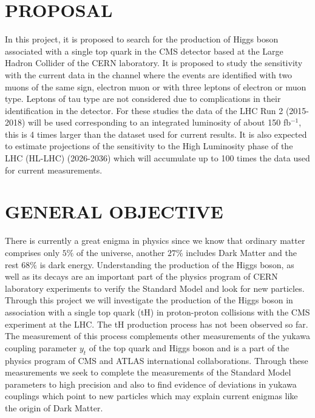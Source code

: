 \documentclass[final,3p]{CSP}
\begin{document}
\newpage
\section{PROPOSAL}

\onehalfspacing In this project, it is proposed to search for the production of Higgs boson associated with a single top quark in the CMS detector based at the Large Hadron Collider of the CERN laboratory.
It is proposed to study the sensitivity with the current data in the channel where the events are identified with two muons of the same sign, electron muon or with three leptons of electron or muon type.
Leptons of tau type are not considered due to complications in their identification in the detector.
For these studies the data of the LHC Run 2 (2015-2018) will be used corresponding to an integrated luminosity of about 150 fb$^{-1}$, this is 4 times larger than the dataset used for current results.
It is also expected to estimate projections of the sensitivity to the High Luminosity phase of the LHC (HL-LHC) (2026-2036) which will accumulate up to 100 times the data used for current measurements. 


\section{GENERAL OBJECTIVE}


\onehalfspacing There is currently a great enigma in physics since we know that ordinary matter comprises only $5\%$ of the universe, another $27\%$ includes Dark Matter and the rest $68\%$ is dark energy.
Understanding the production of the Higgs boson, as well as its decays are an important part of the physics program of CERN laboratory experiments to verify the Standard Model and look for new particles. Through this project we will investigate the production of the Higgs boson in association with a single top quark (tH) in proton-proton collisions with the CMS experiment at the LHC. The tH  production process has not been observed so far.
The measurement of this process complements other measurements of the yukawa coupling parameter $y_t$ of the top quark and Higgs boson and is a part of the physics program of CMS and ATLAS international collaborations. Through these measurements we seek to complete the measurements of the Standard Model parameters to high precision and also to find evidence of deviations in yukawa couplings which point to new particles which may explain current enigmas like the origin of Dark Matter.
\end{document}
